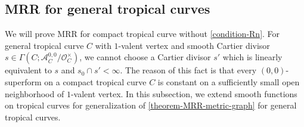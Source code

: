 \documentclass[a4paper,dvipdfmx,reqno,12pt]{amsart}
\theoremstyle{definition}
\newtheorem{remark}[theorem]{Remark}
\newcommand{\opn}[1]{\operatorname{#1}}
\numberwithin{equation}{section}
\begin{document}
\subsection{MRR for general tropical curves}
\label{section-tropical-curve-general}
We will prove MRR for compact tropical curve 
without \cref{condition-Rn}. 
For general tropical curve $C$ with $1$-valent
vertex and smooth Cartier divisor 
$s\in\Gamma(C;\mathcal{A}^{0,0}_C/\mathcal{O}^{\times}_C)$,
we cannot choose a Cartier divisor $s'$ which
is linearly equivalent to $s$ and $s_0\cap s'<\infty$. 
The reason of this fact is that every 
$(0,0)$-superform on a compact tropical curve 
$C$ is constant on a sufficiently
small open neighborhood of $1$-valent vertex.
In this subsection, we extend smooth functions
on tropical curves for generalization of 
\cref{theorem-MRR-metric-graph} for general 
tropical curves.
\end{document}
